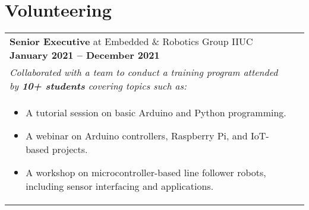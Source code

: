 \documentclass[a4paper,11pt]{article}
\begin{document}
\section{Volunteering}
\begin{tabularx}{\linewidth}{@{}L @{}R}
	\textbf{Senior Executive} at Embedded \& Robotics Group IIUC \hfill \textbf{January 2021 -- December 2021}\\[2pt]
	\emph{Collaborated with a team to conduct a training program attended by \textbf{10+ students} covering topics such as:}\\[4pt]
	\begin{minipage}[t]{\linewidth}
		\begin{itemize}[nosep,after=\strut, leftmargin=1em, itemsep=2pt]
			\item A tutorial session on basic Arduino and Python programming. 
			\item A webinar on Arduino controllers, Raspberry Pi, and IoT-based projects.
			\item A workshop on microcontroller-based line follower robots, including sensor interfacing and applications.
		\end{itemize}
	\end{minipage}
\end{tabularx}



%
\end{document}
